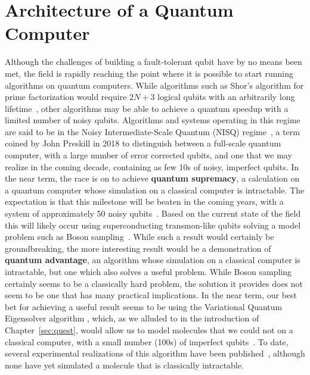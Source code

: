 \chapter{Architecture of a Quantum Computer}

Although the challenges of building a fault-tolerant qubit have by no means been met, the field is rapidly reaching the point where
it is possible to start running algorithms on quantum computers. While algorithms such as Shor's algorithm for prime factorization
would require $2N + 3$ logical qubits with an arbitrarily long lifetime~\cite{Beauregard:2003,6657074}, other algorithms may
be able to achieve a quantum speedup with a limited number of noisy qubits. Algorithms and systems operating in this regime are
said to be in the Noisy Intermediate-Scale Quantum (NISQ) regime~\cite{Preskill2018quantumcomputingin}, a term coined by John Preskill
in 2018 to distinguish between a full-scale quantum computer, with a large number of error corrected qubits, and one that we may realize
in the coming decade, containing as few 10s of noisy, imperfect qubits. In the near term, the race is on to achieve \textbf{quantum supremacy},
a calculation on a quantum computer whose simulation on a classical computer is intractable. The expectation is that this milestone will
be beaten in the coming years, with a system of approximately 50 noisy qubits~\cite{s41567-018-0124-x}. Based on the current state of the field
this will likely occur using superconducting transmon-like qubits solving a model problem such as Boson sampling~\cite{Aaronson:2011}. While such a
result would certainly be groundbreaking, the more interesting result would be a demonstration of \textbf{quantum advantage}, an algorithm whose simulation on a
classical computer is intractable, but one which also solves a useful problem. While Boson sampling certainly seems to be a classically hard problem,
the solution it provides does not seem to be one that has many practical implications. In the near term, our best bet for achieving a useful result
seems to be using the Variational Quantum Eigensolver algorithm \cite{ncomms5213}, which, as we alluded to in the introduction of Chapter~\ref{sec:quest}, would allow us
to model molecules that we could not on a classical computer, with a small number (100s) of imperfect qubits~\cite{PhysRevA.92.042303}.
To date, several experimental realizations of this algorithm have been published~\cite{nature23879,PhysRevX.8.011021,10.1038/s41586-019-1040-7},
although none have yet simulated a molecule that is classically intractable.

